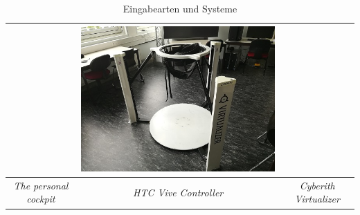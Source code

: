 \begin{table}[h!]
\begin{center}
\begin{tabular}{ | c | c | c | }
\begin{minipage}{.3\textwidth}
    \end{minipage}
    &
    \begin{minipage}{.3\textwidth}
    \vspace*{0.1cm}
      \includegraphics[scale=0.3]{Bilder/Hauptteil/virtualizer1}
    \vspace*{0.1cm}
    \end{minipage}
    \\ 
    \hline
    \textit{The personal cockpit} & \textit{ HTC Vive Controller} & \textit{Cyberith Virtualizer} \\
    \hline
  \end{tabular}
  \caption{Eingabearten und Systeme}
  \label{tab:eingabesysteme}
\end{center}
\end{table}

